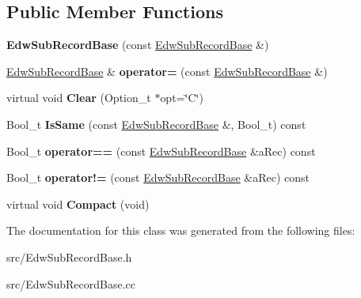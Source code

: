 \subsection*{Public Member Functions}
\begin{DoxyCompactItemize}
\item 
\hypertarget{class_edw_sub_record_base_a5866099f39daaaa91b07afb242db2ff6}{
{\bfseries EdwSubRecordBase} (const \hyperlink{class_edw_sub_record_base}{EdwSubRecordBase} \&)}
\label{class_edw_sub_record_base_a5866099f39daaaa91b07afb242db2ff6}

\item 
\hypertarget{class_edw_sub_record_base_ad582ffdd64a30bba2f7d676527927cc5}{
\hyperlink{class_edw_sub_record_base}{EdwSubRecordBase} \& {\bfseries operator=} (const \hyperlink{class_edw_sub_record_base}{EdwSubRecordBase} \&)}
\label{class_edw_sub_record_base_ad582ffdd64a30bba2f7d676527927cc5}

\item 
\hypertarget{class_edw_sub_record_base_a52e02dd74913484072a2ccefb1e024fb}{
virtual void {\bfseries Clear} (Option\_\-t $\ast$opt=\char`\"{}C\char`\"{})}
\label{class_edw_sub_record_base_a52e02dd74913484072a2ccefb1e024fb}

\item 
\hypertarget{class_edw_sub_record_base_a6956328285c9c111b330129966e172f9}{
Bool\_\-t {\bfseries IsSame} (const \hyperlink{class_edw_sub_record_base}{EdwSubRecordBase} \&, Bool\_\-t) const }
\label{class_edw_sub_record_base_a6956328285c9c111b330129966e172f9}

\item 
\hypertarget{class_edw_sub_record_base_a4e722210ee44689551dd97b21359307c}{
Bool\_\-t {\bfseries operator==} (const \hyperlink{class_edw_sub_record_base}{EdwSubRecordBase} \&aRec) const }
\label{class_edw_sub_record_base_a4e722210ee44689551dd97b21359307c}

\item 
\hypertarget{class_edw_sub_record_base_a8c1730491ed67847b5ce859483d060c3}{
Bool\_\-t {\bfseries operator!=} (const \hyperlink{class_edw_sub_record_base}{EdwSubRecordBase} \&aRec) const }
\label{class_edw_sub_record_base_a8c1730491ed67847b5ce859483d060c3}

\item 
\hypertarget{class_edw_sub_record_base_a0980275e8ace16886e1bfed3e33af3d3}{
virtual void {\bfseries Compact} (void)}
\label{class_edw_sub_record_base_a0980275e8ace16886e1bfed3e33af3d3}

\end{DoxyCompactItemize}


The documentation for this class was generated from the following files:\begin{DoxyCompactItemize}
\item 
src/EdwSubRecordBase.h\item 
src/EdwSubRecordBase.cc\end{DoxyCompactItemize}
